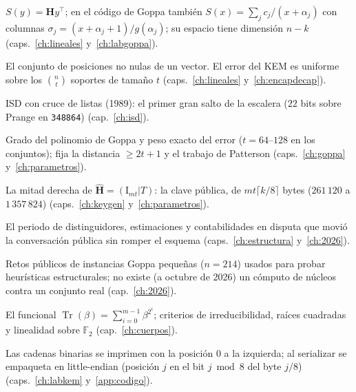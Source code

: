 \documentclass[11pt,a4paper,oneside]{report}
\newcommand{\F}{\mathbb{F}}
\newcommand{\supp}{\operatorname{supp}}
\newcommand{\Hmat}{\mathbf{H}}          %
\newcommand{\Tmat}{\mathbf{T}}          %
\newcommand{\Ftwo}{\F_2}
\DeclareMathOperator{\Tr}{Tr}
\begin{document}
\begin{description}[leftmargin=2.6em,style=nextline,itemsep=2.5pt,parsep=0pt]
  \item[\textbf{Síndrome}]
        $S(y)=\Hmat y^{\top}$; en el código de Goppa también
        $S(x)=\sum_j c_j/(x+\alpha_j)$ con columnas
        $\sigma_j=(x+\alpha_j+1)/g(\alpha_j)$; su espacio tiene
        dimensión $n-k$ (caps.~\ref{ch:lineales}
        y~\ref{ch:labgoppa}).

  \item[\textbf{Soporte} ($\supp$)]
        El conjunto de posiciones no nulas de un vector. El error
        del KEM es uniforme sobre los $\binom{n}{t}$ soportes de
        tamaño $t$ (caps.~\ref{ch:lineales}
        y~\ref{ch:encapdecap}).

  \item[\textbf{Stern (algoritmo de)}]
        ISD con cruce de listas (1989): el primer gran salto de la
        escalera ($22$ bits sobre Prange en \texttt{348864})
        (cap.~\ref{ch:isd}).

  \item[\textbf{$t$}]
        Grado del polinomio de Goppa y peso exacto del error
        ($t=64$--$128$ en los conjuntos); fija la distancia
        $\ge2t+1$ y el trabajo de Patterson
        (caps.~\ref{ch:goppa} y~\ref{ch:parametros}).

  \item[\textbf{$\Tmat$ (clave pública)}]
        La mitad derecha de $\hat{\Hmat}=(\mathrm{I}_{mt}|T)$: la
        clave pública, de $mt\lceil k/8\rceil$ bytes
        ($261\,120$ a $1\,357\,824$) (caps.~\ref{ch:keygen}
        y~\ref{ch:parametros}).

  \item[\textbf{Terremoto (2025--2026)}]
        El periodo de distinguidores, estimaciones y contabilidades
        en disputa que movió la conversación pública sin romper el
        esquema (caps.~\ref{ch:estructura} y~\ref{ch:2026}).

  \item[\textbf{TII}]
        Retos públicos de instancias Goppa pequeñas ($n=214$)
        usados para probar heurísticas estructurales; no existe
        (a octubre de 2026) un cómputo de núcleos contra un
        conjunto real (cap.~\ref{ch:2026}).

  \item[\textbf{Traza} ($\Tr$)]
        El funcional $\Tr(\beta)=\sum_{i=0}^{m-1}\beta^{2^i}$;
        criterios de irreducibilidad, raíces cuadradas y
        linealidad sobre $\Ftwo$ (cap.~\ref{ch:cuerpos}).

  \item[\textbf{Vectores (notación)}]
        Las cadenas binarias se imprimen con la posición $0$ a la
        izquierda; al serializar se empaqueta en little-endian
        (posición $j$ en el bit $j\bmod8$ del byte $j/8$)
        (caps.~\ref{ch:labkem} y~\ref{app:codigo}).


\end{description}
\end{document}
